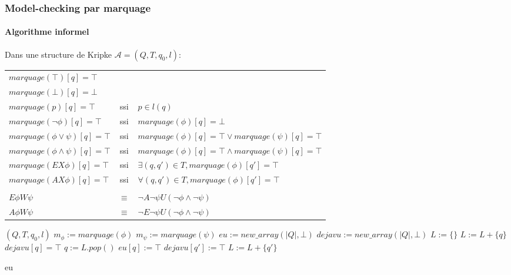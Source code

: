 \documentclass[11pt]{beamer}
\begin{document}
\begin{frame}
    \frametitle{Model-checking par marquage}
    \framesubtitle{Algorithme informel}

    Dans une structure de Kripke $\mathcal{A}=(Q, T, q_0, l)$:\\\bigskip
    \begin{tabular}{lcl}
        $marquage(\top)[q] = \top$&&\\
        $marquage(\bot)[q] = \bot$&&\\
        $marquage(p)[q] = \top$&ssi& $p\in l(q)$\\
        $marquage(\neg \phi)[q] = \top$&ssi&$marquage(\phi)[q] = \bot$\\
        $marquage(\phi \lor \psi)[q] = \top$&ssi&$marquage(\phi)[q] = \top \lor marquage(\psi)[q] = \top$\\
        $marquage(\phi \land \psi)[q] = \top$&ssi&$marquage(\phi)[q] = \top \land marquage(\psi)[q] = \top$\\
        $marquage(EX\phi)[q] = \top$&ssi&$\exists (q, q') \in T, marquage(\phi)[q'] = \top$\\
        $marquage(AX\phi)[q] = \top$&ssi&$\forall (q, q') \in T, marquage(\phi)[q'] = \top$\\\\\pause
        $E\phi W \psi$ &$\equiv$ &$\neg A \neg \psi U (\neg \phi \land \neg \psi)$\\
        $A\phi W \psi$ &$\equiv$ &$\neg E \neg \psi U (\neg \phi \land \neg \psi)$\\
    \end{tabular}
\end{frame}

\begin{frame}[fragile]
\begin{algorithm}[H]
\caption{$E\phi U\psi$}

\begin{multicols}{2}
\begin{algorithmic}[1]
    \REQUIRE $(Q, T, q_0, l)$
    \STATE $m_\phi := marquage(\phi)$
    \STATE $m_\psi := marquage(\psi)$
    \STATE $eu := new\_array(|Q|, \bot)$
    \STATE $dejavu := new\_array(|Q|, \bot)$
    \STATE $L := \{\}$
            \STATE $L := L + \{ q \}$
            \STATE $dejavu[q] = \top$
        \ENDIF
    \ENDFOR
        \STATE $q := L.pop()$
        \STATE $eu[q] := \top$
                \STATE $dejavu[q'] := \top$
                    \STATE $L := L + \{q'\}$
                \ENDIF
            \ENDIF
        \ENDFOR
    \ENDWHILE

    \RETURN eu
\end{algorithmic}
\end{multicols}
\end{algorithm}

\end{frame}
\end{document}
